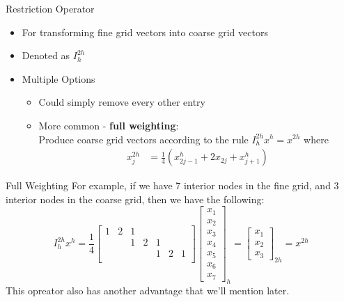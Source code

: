 \documentclass[11pt]{beamer}
\begin{document}
\begin{frame}{Restriction Operator}
  \begin{itemize}
  \item For transforming fine grid vectors into coarse grid vectors 
  \item Denoted as $I_h^{2h}$
  \item Multiple Options
    \begin{itemize}
    \item Could simply remove every other entry
    \item More common - \textbf{full weighting}:\\
      Produce coarse grid vectors according to the rule \(I_{h}^{2h} x^{h} =
      x^{2h}\) where
      \begin{align*}
        x_{j}^{2h} &= \frac{1}{4} \left( x_{2j-1}^{h} + 2x_{2j} + x_{j+1}^{h} \right)
      \end{align*}
    \end{itemize}
  \end{itemize}
\end{frame}
\begin{frame}{Full Weighting}
  For example, if we have 7 interior nodes in the fine grid, and 3 interior nodes in
  the coarse grid, then we have the following: \[
    I_{h}^{2h} x^{h} = \frac{1}{4} 
    \begin{bmatrix}
      1 & 2 & 1 &   &   &   & \\
      &   & 1 & 2 & 1 &   & \\
      &   &   &   & 1 & 2 & 1 \\
    \end{bmatrix}
    \begin{bmatrix}
      x_1 \\ x_2 \\ x_3 \\ x_4 \\ x_5 \\ x_6 \\ x_7
    \end{bmatrix}_{h}
    = \begin{bmatrix}
      x_1 \\ x_2 \\ x_3
    \end{bmatrix}_{2h} = x^{2h}
  \]
  This opreator also has another advantage that we'll mention later.
\end{frame}
\end{document}
